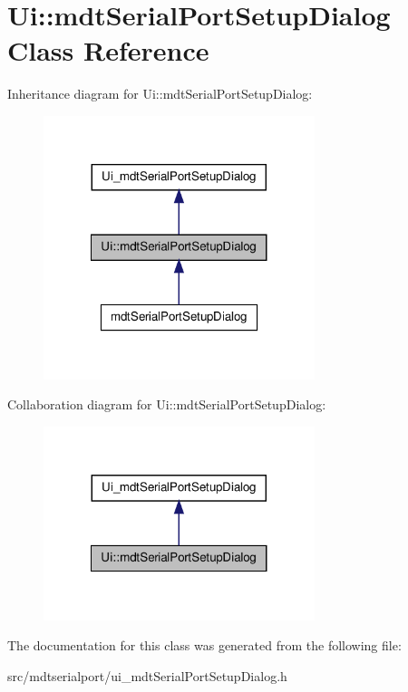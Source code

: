 \hypertarget{class_ui_1_1mdt_serial_port_setup_dialog}{
\section{Ui::mdtSerialPortSetupDialog Class Reference}
\label{class_ui_1_1mdt_serial_port_setup_dialog}
}


Inheritance diagram for Ui::mdtSerialPortSetupDialog:\nopagebreak
\begin{figure}[H]
\begin{center}
\leavevmode
\includegraphics[width=224pt]{class_ui_1_1mdt_serial_port_setup_dialog__inherit__graph}
\end{center}
\end{figure}


Collaboration diagram for Ui::mdtSerialPortSetupDialog:\nopagebreak
\begin{figure}[H]
\begin{center}
\leavevmode
\includegraphics[width=224pt]{class_ui_1_1mdt_serial_port_setup_dialog__coll__graph}
\end{center}
\end{figure}


The documentation for this class was generated from the following file:\begin{DoxyCompactItemize}
\item 
src/mdtserialport/ui\_\-mdtSerialPortSetupDialog.h\end{DoxyCompactItemize}
